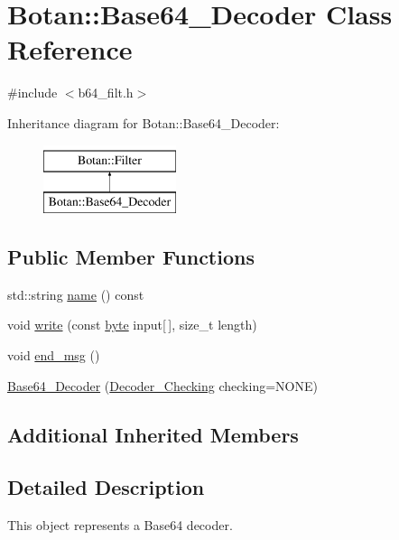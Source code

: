 \hypertarget{classBotan_1_1Base64__Decoder}{\section{Botan\-:\-:Base64\-\_\-\-Decoder Class Reference}
\label{classBotan_1_1Base64__Decoder}
}


{\ttfamily \#include $<$b64\-\_\-filt.\-h$>$}

Inheritance diagram for Botan\-:\-:Base64\-\_\-\-Decoder\-:\begin{figure}[H]
\begin{center}
\leavevmode
\includegraphics[height=2.000000cm]{classBotan_1_1Base64__Decoder}
\end{center}
\end{figure}
\subsection*{Public Member Functions}
\begin{DoxyCompactItemize}
\item 
std\-::string \hyperlink{classBotan_1_1Base64__Decoder_a8ad1087d886322d5d7c9f600ac40b6d8}{name} () const 
\item 
void \hyperlink{classBotan_1_1Base64__Decoder_ac6be3c2990360afb835201b8d9984542}{write} (const \hyperlink{namespaceBotan_a7d793989d801281df48c6b19616b8b84}{byte} input\mbox{[}$\,$\mbox{]}, size\-\_\-t length)
\item 
void \hyperlink{classBotan_1_1Base64__Decoder_a8a961f1989e44a50642a1a40eb5319a2}{end\-\_\-msg} ()
\item 
\hyperlink{classBotan_1_1Base64__Decoder_a49afd345b4cc8dc5942e9ead63befc5a}{Base64\-\_\-\-Decoder} (\hyperlink{namespaceBotan_acd5baf937a9984c39f8b44104dde76ae}{Decoder\-\_\-\-Checking} checking=N\-O\-N\-E)
\end{DoxyCompactItemize}
\subsection*{Additional Inherited Members}


\subsection{Detailed Description}
This object represents a Base64 decoder. 

